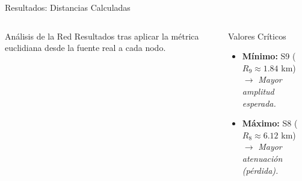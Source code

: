 \begin{frame}{Resultados: Distancias Calculadas}
\begin{columns}[c]
        \begin{block}{Análisis de la Red}
            \scriptsize
            Resultados tras aplicar la métrica euclidiana desde la fuente real a cada nodo.
        \end{block}

        \vspace{0.4cm}

        \begin{block}{Valores Críticos}
            \scriptsize
            \begin{itemize}
                \item \textbf{Mínimo:} S9 ($R_9 \approx 1.84$ km) \\
                \vspace{0.1cm}
                $\rightarrow$ \textit{Mayor amplitud esperada.}
                
                \vspace{0.4cm}
                
                \item \textbf{Máximo:} S8 ($R_8 \approx 6.12$ km) \\
                \vspace{0.1cm}
                $\rightarrow$ \textit{Mayor atenuación (pérdida).}
            \end{itemize}
        \end{block}

    \end{columns}

\end{frame}